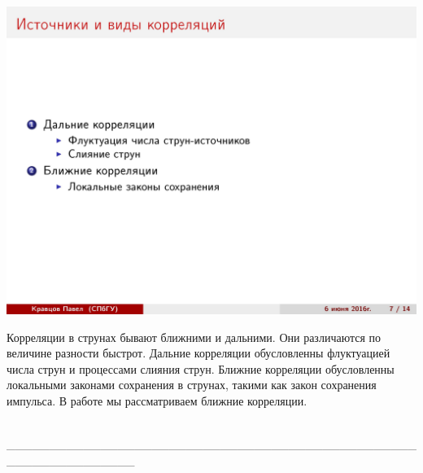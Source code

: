 \documentclass[14pt]{article}
\renewcommand{\line}{\\ \_\_\_\_\_\_\_\_\_\_\_\_\_\_\_\_\_\_\_\_\_\_\_\_\_\_\_\_\_\_\_\_\_\_\_\_\_\_\_\_\_\_\_\_\_\_\_\_\_\_\_\_\_\_\_\_\_\_\_\_\_\_\_ \\ }
\begin{document}
\begin{minipage}[h]{0.5\linewidth}
\includegraphics[width=1\linewidth]{page-07.jpg}
\end{minipage}
\begin{minipage}[h]{0.45\linewidth}
Корреляции в струнах бывают ближними и дальними. Они различаются по величине разности быстрот. Дальние корреляции обусловленны флуктуацией числа струн и процессами слияния струн. Ближние корреляции обусловленны локальными законами сохранения в струнах, такими как закон сохранения импульса. В работе мы рассматриваем ближние корреляции.
\end{minipage}
\line
\end{document}
